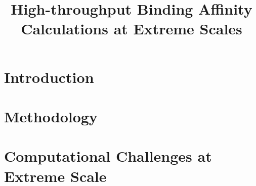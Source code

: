\documentclass[conference]{IEEEtran}
\begin{document}
\title{High-throughput Binding Affinity Calculations at Extreme Scales}

\author{
}


\maketitle
\begin{abstract}

\end{abstract}


\section{Introduction}\label{sec:intro}



\section{Methodology}\label{sec:meth}





\section{Computational Challenges at Extreme Scale}\label{sec:3}

\end{document}
